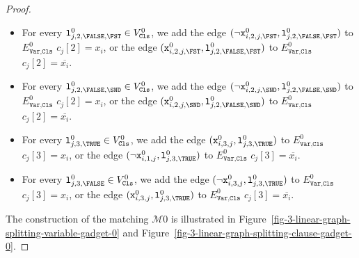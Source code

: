 \begin{proof}
\begin{itemize}
      \item
      For every $\texttt{l}^{0}_{j, 2, \FALSE, \FST} \in V^{0}_{\texttt{Cls}}$, we add
      the edge $(\neg\texttt{x}^{0}_{i,2,j,\FST}, \texttt{l}^{0}_{j, 2, \FALSE, \FST})$
      to $E^{0}_{\texttt{Var},\texttt{Cls}}$
      $c_{j}[2] = x_{i}$, or
      the edge $(\texttt{x}^{0}_{i,2,j,\FST}, \texttt{l}^{0}_{j, 2, \FALSE, \FST})$
      to $E^{0}_{\texttt{Var},\texttt{Cls}}$
      $c_{j}[2] = \overline{x_{i}}$.

      \item
      For every $\texttt{l}^{0}_{j, 2, \FALSE, \SND} \in V^{0}_{\texttt{Cls}}$, we add
      the edge $(\neg\texttt{x}^{0}_{i,2,j,\SND}, \texttt{l}^{0}_{j, 2, \FALSE, \SND})$
      to $E^{0}_{\texttt{Var},\texttt{Cls}}$
      $c_{j}[2] = x_{i}$, or
      the edge $(\texttt{x}^{0}_{i,2,j,\SND}, \texttt{l}^{0}_{j, 2, \FALSE, \SND})$
      to $E^{0}_{\texttt{Var},\texttt{Cls}}$
      $c_{j}[2] = \overline{x_{i}}$.

      \item
      For every $\texttt{l}^{0}_{j, 3, \TRUE} \in V^{0}_{\texttt{Cls}}$,
      we add
      the edge $(\texttt{x}^{0}_{i,3,j}, \texttt{l}^{0}_{j, 3, \TRUE})$
      to $E^{0}_{\texttt{Var},\texttt{Cls}}$
      $c_{j}[3] = x_{i}$, or
      the edge $(\neg\texttt{x}^{0}_{i,1,j}, \texttt{l}^{0}_{j, 3, \TRUE})$
      to $E^{0}_{\texttt{Var},\texttt{Cls}}$
      $c_{j}[3] = \overline{x_{i}}$.

      \item
      For every $\texttt{l}^{0}_{j, 3, \FALSE} \in V^{0}_{\texttt{Cls}}$,
      we add
      the edge $(\neg\texttt{x}^{0}_{i,3,j}, \texttt{l}^{0}_{j, 3, \TRUE})$
      to $E^{0}_{\texttt{Var},\texttt{Cls}}$
      $c_{j}[3] = x_{i}$, or
      the edge $(\texttt{x}^{0}_{i,3,j}, \texttt{l}^{0}_{j, 3, \TRUE})$
      to $E^{0}_{\texttt{Var},\texttt{Cls}}$
      $c_{j}[3] = \overline{x_{i}}$.
    \end{itemize}
  
  \medskip

  The construction of the matching $\mathcal{M}{0}$ is illustrated
  in Figure~\ref{fig-3-linear-graph-splitting-variable-gadget-0} and
  Figure~\ref{fig-3-linear-graph-splitting-clause-gadget-0}.

  

  


\end{proof}
